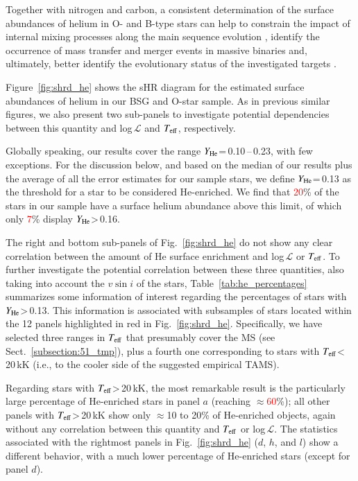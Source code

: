 \documentclass{aa}
\newcommand{\vsini}{\mbox{$v\sin i$}\xspace}
\newcommand{\Teff}{\mbox{$T_{\rm eff}$}\xspace}
\newcommand{\Ls}{$ \mathcal{L}$\xspace}
\newcommand{\He}{$Y_{\rm He}$\xspace}
\newcommand{\num}[1]{\textcolor{red}{#1}}
\begin{document}
Together with nitrogen and carbon, a consistent determination of the surface abundances of helium in O- and B-type stars can help to constrain the impact of internal mixing processes along the main sequence evolution \citep[see, e.g.,][]{martins05, rivero-gonzalez12, carneiro16, grin17}, identify the occurrence of mass transfer and merger events in massive binaries \citep[see, e.g.,][]{langer12, langer20, demink13, glebbeek13, schneider16, sen22, menon23} and, ultimately, better identify the evolutionary status of the investigated targets \citep[e.g., whether they are in a H- or He-core burning stage; see,][and references therein]{georgy21}. 

Figure~\ref{fig:shrd_he} shows the sHR diagram for the estimated surface abundances of helium in our BSG and O-star sample. As in previous similar figures, we also present two sub-panels to investigate potential dependencies between this quantity and log\,\Ls and \Teff, respectively.

Globally speaking, our results cover the range \He=\,0.10\,--\,0.23, with few exceptions. For the discussion below, and based on the median of our results plus the average of all the error estimates for our sample stars, we define \He=\,0.13 as the threshold for a star to be considered He-enriched. We find that \num{20}\% of the stars in our sample have a surface helium abundance above this limit, of which only \num{7}\% display \He>\,0.16. 

The right and bottom sub-panels of Fig.~\ref{fig:shrd_he} do not show any clear correlation between the amount of He surface enrichment and log\,\Ls or \Teff. To further investigate the potential correlation between these three quantities, also taking into account the \vsini of the stars, Table~\ref{tab:he_percentages} summarizes some information of interest regarding the percentages of stars with \He>\,0.13. This information is associated with subsamples of stars located within the 12 panels highlighted in red in Fig.~\ref{fig:shrd_he}. Specifically, we have selected three ranges in \Teff that presumably cover the MS (see Sect.~\ref{subsection:51_tmp}), plus a fourth one corresponding to stars with \Teff<\,20\,kK (i.e., to the cooler side of the suggested empirical TAMS).

Regarding stars with \Teff>\,20\,kK, the most remarkable result is the particularly large percentage of He-enriched stars in panel $a$ (reaching $\approx$\num{60}\%); all other panels with \Teff>\,20\,kK show only $\approx$10 to 20\% of He-enriched objects, again without any correlation between this quantity and \Teff or log\,\Ls. The statistics associated with the rightmost panels in Fig.~\ref{fig:shrd_he} ($d$, $h$, and $l$) show a different behavior, with a much lower percentage of He-enriched stars (except for panel $d$).
\end{document}
